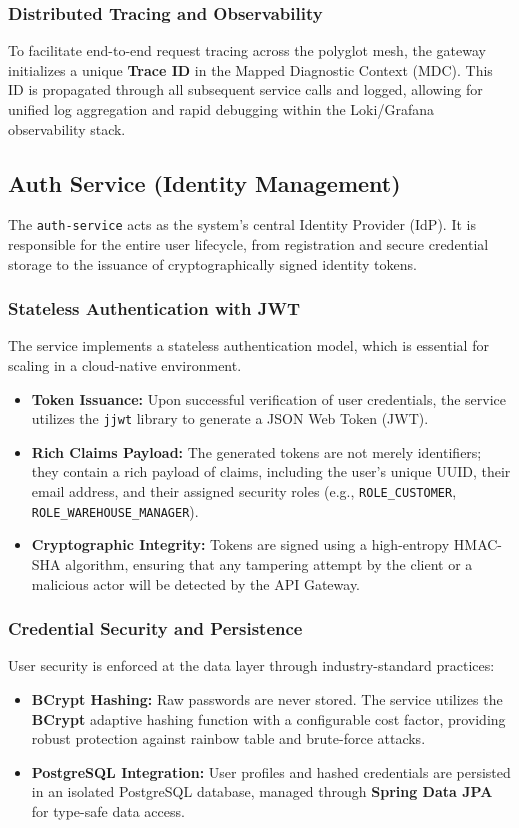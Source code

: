 \documentclass[12pt,a4paper]{report}
\begin{document}
\subsubsection{Distributed Tracing and Observability}
To facilitate end-to-end request tracing across the polyglot mesh, the gateway initializes a unique \textbf{Trace ID} in the Mapped Diagnostic Context (MDC). This ID is propagated through all subsequent service calls and logged, allowing for unified log aggregation and rapid debugging within the Loki/Grafana observability stack.

\subsection{Auth Service (Identity Management)}
The \texttt{auth-service} acts as the system's central Identity Provider (IdP). It is responsible for the entire user lifecycle, from registration and secure credential storage to the issuance of cryptographically signed identity tokens.

\subsubsection{Stateless Authentication with JWT}
The service implements a stateless authentication model, which is essential for scaling in a cloud-native environment.
\begin{itemize}
    \item \textbf{Token Issuance:} Upon successful verification of user credentials, the service utilizes the \texttt{jjwt} library to generate a JSON Web Token (JWT).
    \item \textbf{Rich Claims Payload:} The generated tokens are not merely identifiers; they contain a rich payload of claims, including the user's unique UUID, their email address, and their assigned security roles (e.g., \texttt{ROLE\_CUSTOMER}, \texttt{ROLE\_WAREHOUSE\_MANAGER}).
    \item \textbf{Cryptographic Integrity:} Tokens are signed using a high-entropy HMAC-SHA algorithm, ensuring that any tampering attempt by the client or a malicious actor will be detected by the API Gateway.
\end{itemize}

\subsubsection{Credential Security and Persistence}
User security is enforced at the data layer through industry-standard practices:
\begin{itemize}
    \item \textbf{BCrypt Hashing:} Raw passwords are never stored. The service utilizes the \textbf{BCrypt} adaptive hashing function with a configurable cost factor, providing robust protection against rainbow table and brute-force attacks.
    \item \textbf{PostgreSQL Integration:} User profiles and hashed credentials are persisted in an isolated PostgreSQL database, managed through \textbf{Spring Data JPA} for type-safe data access.
\end{itemize}
\end{document}
